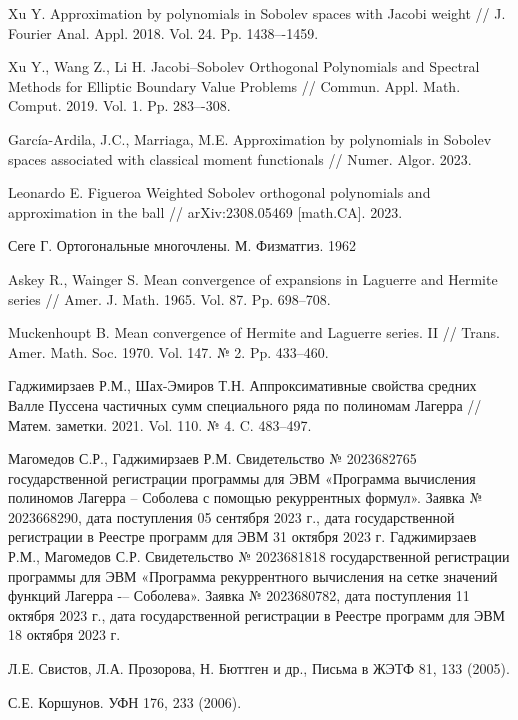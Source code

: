 \begin{thebibliography}{111}
{Xu Y.} Approximation by polynomials in Sobolev spaces with Jacobi weight // J. Fourier Anal. Appl. 2018. Vol. 24. Pp. 1438–-1459.


{Xu Y., Wang Z., Li H.} Jacobi–Sobolev Orthogonal Polynomials and Spectral Methods for Elliptic Boundary Value Problems //
Commun. Appl. Math. Comput. 2019. Vol. 1. Pp. 283–-308.

{Garc\'ia-Ardila, J.C., Marriaga, M.E.} Approximation by polynomials in Sobolev spaces associated with classical moment functionals //
Numer. Algor. 2023.

{Leonardo E. Figueroa} Weighted Sobolev orthogonal polynomials and approximation in the ball // arXiv:2308.05469 [math.CA]. 2023.

{Сеге Г.} Ортогональные многочлены. М. Физматгиз. 1962

{Askey R., Wainger S.} Mean convergence of expansions in Laguerre and Hermite series // Amer. J. Math. 1965. Vol. 87. Pp. 698--708.

{Muckenhoupt B.} Mean convergence of Hermite and Laguerre series. II // Trans. Amer. Math. Soc. 1970. Vol. 147. № 2. Pp. 433--460.

{Гаджимирзаев Р.М., Шах-Эмиров Т.Н.} Аппроксимативные свойства средних Валле Пуссена частичных сумм специального ряда по полиномам Лагерра //
Матем. заметки. 2021. Vol. 110. № 4. C. 483--497.												

{Магомедов С.Р., Гаджимирзаев Р.М.} Свидетельство № 2023682765 государственной регистрации программы для ЭВМ «Программа вычисления полиномов Лагерра -- Соболева с помощью рекуррентных формул». Заявка № 2023668290, дата поступления 05 сентября 2023 г., дата государственной регистрации в Реестре программ для ЭВМ 31 октября 2023 г.
{Гаджимирзаев Р.М., Магомедов С.Р.} Свидетельство № 2023681818 государственной регистрации программы для ЭВМ «Программа рекуррентного вычисления на сетке значений функций Лагерра -– Соболева». Заявка № 2023680782, дата поступления 11 октября 2023 г., дата государственной регистрации в Реестре программ для ЭВМ 18 октября 2023 г.


Л.Е. Свистов, Л.А. Прозорова, Н. Бюттген и др., Письма в ЖЭТФ 81, 133 (2005).

С.Е. Коршунов. УФН 176, 233 (2006).


\end{thebibliography}
